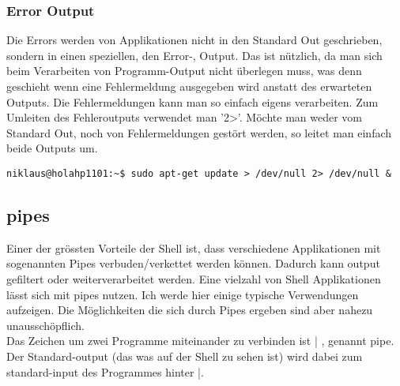 \subsubsection{Error Output}
Die Errors werden von Applikationen nicht in den Standard Out geschrieben, sondern in einen speziellen, den Error-, Output. Das ist n\"utzlich, da man sich beim Verarbeiten von Programm-Output nicht \"uberlegen muss, was denn geschieht wenn eine Fehlermeldung ausgegeben wird anstatt des erwarteten Outputs. Die Fehlermeldungen kann man so einfach eigens verarbeiten. Zum Umleiten des Fehleroutputs verwendet man '2\textgreater'. M\"ochte man weder vom Standard Out, noch von Fehlermeldungen gest\"ort werden, so leitet man einfach beide Outputs um.
\begin{lstlisting}
niklaus@holahp1101:~$ sudo apt-get update > /dev/null 2> /dev/null &
\end{lstlisting}
\subsection{pipes}
Einer der gr\"ossten Vorteile der Shell ist, dass verschiedene Applikationen mit sogenannten Pipes verbuden/verkettet werden k\"onnen. Dadurch kann output gefiltert oder weiterverarbeitet werden. Eine vielzahl von Shell Applikationen l\"asst sich mit pipes nutzen. Ich werde hier einige typische Verwendungen aufzeigen. Die M\"oglichkeiten die sich durch Pipes ergeben sind aber nahezu unaussch\"opflich.\\
Das Zeichen um zwei Programme miteinander zu verbinden ist | , genannt pipe. Der Standard-output (das was auf der Shell zu sehen ist) wird dabei zum standard-input des Programmes hinter |.
